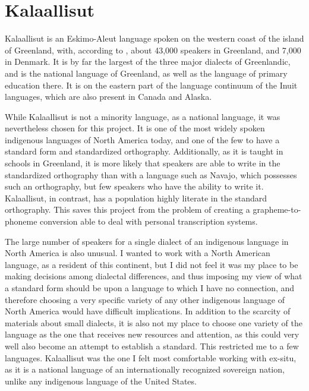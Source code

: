 \documentclass[12pt]{article}
\begin{document}
\section{Kalaallisut}

Kalaallisut is an Eskimo-Aleut language spoken on the western coast of the island of Greenland, with, according to \citet{ethnologue}, about 43,000 speakers in Greenland, and 7,000 in Denmark. It is by far the largest of the three major dialects of Greenlandic, and is the national language of Greenland, as well as the language of primary education there. It is on the eastern part of the language continuum of the Inuit languages, which are also present in Canada and Alaska. \par

While Kalaallisut is not a minority language, as a national language, it was nevertheless chosen for this project. It is one of the most widely spoken indigenous languages of North America today, and one of the few to have a standard form and standardized orthography. Additionally, as it is taught in schools in Greenland, it is more likely that speakers are able to write in the standardized orthography than with a language such as Navajo, which possesses such an orthography, but few speakers who have the ability to write it. Kalaallisut, in contrast, has a population highly literate in the standard orthography. This saves this project from the problem of creating a grapheme-to-phoneme conversion able to deal with personal transcription systems. \par

The large number of speakers for a single dialect of an indigenous language in North America is also unusual. I wanted to work with a North American language, as a resident of this continent, but I did not feel it was my place to be making decisions among dialectal differences, and thus imposing my view of what a standard form should be upon a language to which I have no connection, and therefore choosing a very specific variety of any other indigenous language of North America would have difficult implications. In addition to the scarcity of materials about small dialects, it is also not my place to choose one variety of the language as the one that receives new resources and attention, as this could very well also become an attempt to establish a standard. This restricted me to a few languages. Kalaallisut was the one I felt most comfortable working with ex-situ, as it is a national language of an internationally recognized sovereign nation, unlike any indigenous language of the United States. \par
\end{document}
